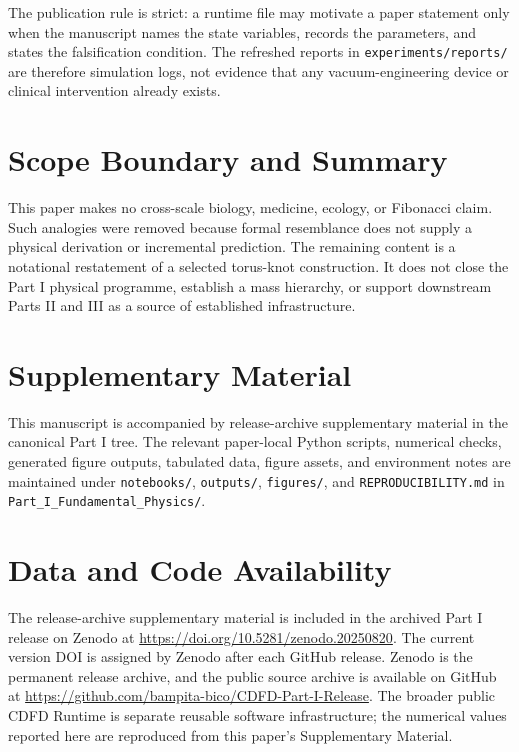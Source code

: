\documentclass[11pt]{article}
\begin{document}
The publication rule is strict: a runtime file may motivate a paper statement
only when the manuscript names the state variables, records the parameters, and
states the falsification condition. The refreshed reports in
\texttt{experiments/reports/} are therefore simulation logs, not evidence that
any vacuum-engineering device or clinical intervention already exists.


\section{Scope Boundary and Summary}

This paper makes no cross-scale biology, medicine, ecology, or Fibonacci claim.
Such analogies were removed because formal resemblance does not supply a
physical derivation or incremental prediction. The remaining content is a
notational restatement of a selected torus-knot construction. It does not close
the Part I physical programme, establish a mass hierarchy, or support
downstream Parts II and III as a source of established infrastructure.


\section*{Supplementary Material}

This manuscript is accompanied by release-archive supplementary material in
the canonical Part I tree. The relevant paper-local Python scripts, numerical checks, generated figure outputs,
tabulated data, figure assets, and environment notes are maintained under
\texttt{notebooks/}, \texttt{outputs/}, \texttt{figures/}, and
\texttt{REPRODUCIBILITY.md} in \texttt{Part\_I\_Fundamental\_Physics/}.


\section*{Data and Code Availability}

The release-archive supplementary material is included in the archived Part I
release on Zenodo at \url{https://doi.org/10.5281/zenodo.20250820}. The current version DOI is assigned by Zenodo after each GitHub release. Zenodo is the
permanent release archive, and the public source archive is available on GitHub at
\url{https://github.com/bampita-bico/CDFD-Part-I-Release}. The broader public CDFD
Runtime is separate reusable software infrastructure; the numerical values reported
here are reproduced from this paper's Supplementary Material.
\end{document}
